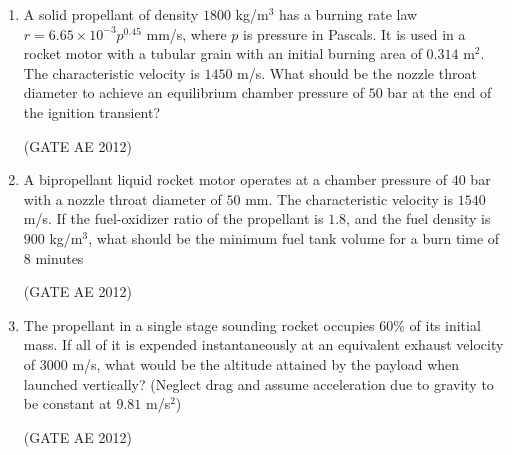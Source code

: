 \documentclass[journal,12pt,onecolumn]{IEEEtran}
\theoremstyle{remark}
\begin{document}
\begin{enumerate}
\item A solid propellant of density $1800$ kg/m$^3$ has a burning rate law $r = 6.65 \times 10^{-3} p^{0.45}$ mm/s, where $p$ is pressure in Pascals. It is used in a rocket motor with a tubular grain with an initial burning area of $0.314$ m$^2$. The characteristic velocity is $1450$ m/s. What should be the nozzle throat diameter to achieve an equilibrium chamber pressure of $50$ bar at the end of the ignition transient?
\begin{enumerate}
\end{enumerate}
\hfill(GATE AE 2012)



\item A bipropellant liquid rocket motor operates at a chamber pressure of $40$ bar with a nozzle throat diameter of $50$ mm. The characteristic velocity is $1540$ m/s. If the fuel-oxidizer ratio of the propellant is $1.8$, and the fuel density is $900$ kg/m$^3$, what should be the minimum fuel tank volume for a burn time of $8$ minutes
\begin{enumerate}
\end{enumerate}
\hfill(GATE AE 2012)



\item The propellant in a single stage sounding rocket occupies $60\%$ of its initial mass. If all of it is expended instantaneously at an equivalent exhaust velocity of $3000$ m/s, what would be the altitude attained by the payload when launched vertically?
(Neglect drag and assume acceleration due to gravity to be constant at $9.81$ m/s$^2$)
\begin{enumerate}
\end{enumerate}
\hfill(GATE AE 2012)




\end{enumerate}
\end{document}
